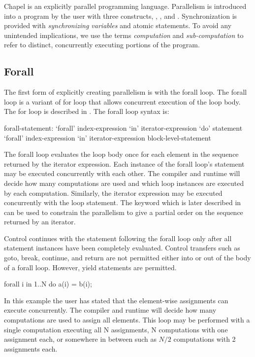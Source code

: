 \label{Parallelism_and_Synchronization}

Chapel is an explicitly parallel programming language. Parallelism is
introduced into a program by the user with three constructs,
, , and .  Synchronization is
provided with \emph{synchronizing variables} and atomic statements. To
avoid any unintended implications, we use the terms \emph{computation}
and \emph{sub-computation} to refer to distinct, concurrently
executing portions of the program.


\subsection{Forall}
\label{Forall}

The first form of explicitly creating parallelism is with the forall
loop. The forall loop is a variant of for loop that allows concurrent
execution of the loop body. The for loop is described
in . The forall loop syntax is:
\begin{syntax}
forall-statement:
   `forall' index-expression `in' iterator-expression `do' statement
   `forall' index-expression `in' iterator-expression block-level-statement
\end{syntax}

The forall loop evaluates the loop body once for each element in the
sequence returned by the iterator expression. Each instance of the
forall loop's statement may be executed concurrently with each
other. The compiler and runtime will decide how many computations are
used and which loop instances are executed by each
computation. Similarly, the iterator expression may be executed
concurrently with the loop statement. The keyword  which is
later described in  can be used to constrain the
parallelism to give a partial order on the sequence returned by an
iterator.

Control continues with the statement following the forall loop only
after all statement instances have been completely evaluated.  Control
transfers such as goto, break, continue, and return are not permitted
either into or out of the body of a forall loop.  However, yield
statements are permitted.

\begin{example}
\begin{chapel}
forall i in 1..N do
  a(i) = b(i);
\end{chapel}
In this example the user has stated that the element-wise assignments
can execute concurrently. The compiler and runtime will decide how
many computations are used to assign all  elements. This loop
may be performed with a single computation executing all N
assignments, N computations with one assignment each, or somewhere
in between such as $N/2$ computations with 2 assignments each.
\end{example}


